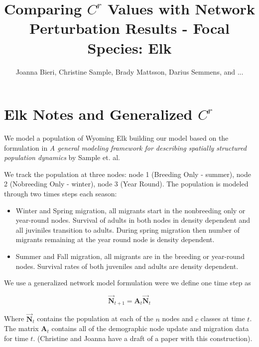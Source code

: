 \documentclass[10pt]{article}
\title{Comparing $C^r$ Values with Network Perturbation Results - Focal Species: Elk}
\date{}
\author{Joanna Bieri, Christine Sample, Brady Mattsson, Darius Semmens, and ...}
\begin{document}


\newcommand{\multilineR}[1]{\begin{tabular}[b]{@{}r@{}}#1\end{tabular}}
\newcommand{\multilineL}[1]{\begin{tabular}[b]{@{}l@{}}#1\end{tabular}}
\newcommand{\multilineC}[1]{\begin{tabular}[b]{@{}c@{}}#1\end{tabular}}

\thispagestyle{empty}

\maketitle

\tableofcontents


\section{Elk Notes and Generalized \texorpdfstring{$C^r$}{CR} }
We model a population of Wyoming Elk building our model based on the formulation in  {\it{A general modeling framework for describing spatially structured population dynamics}} by Sample et. al.

We track the population at three nodes: node 1 (Breeding Only - summer), node 2 (Nobreeding Only - winter), node 3 (Year Round). The population is modeled through two times steps each season:
\begin{itemize}
\item Winter and Spring migration, all migrants start in the nonbreeding only or year-round nodes. Survival of adults in both nodes in density dependent and all juviniles transition to adults. During spring migration then number of migrants remaining at the year round node is density dependent.
\item Summer and Fall migration, all migrants are in the breeding or year-round nodes. Survival rates of both juveniles and adults are density dependent.
\end{itemize}

We use a generalized network model formulation were we define one time step as

\begin{equation}
\vec{\mathbf{N}}_{t+1}={\mathbf{A}_t}\vec{\mathbf{N}}_t
\end{equation}

Where $\vec{\mathbf{N}}_{t}$ contains the population at each of the $n$ nodes and $c$ classes at time $t$. The matrix $\mathbf{A}_t$ contains all of the demographic node update and migration data for time $t$. (Christine and Joanna have a draft of a paper with this construction).\\
\end{document}
